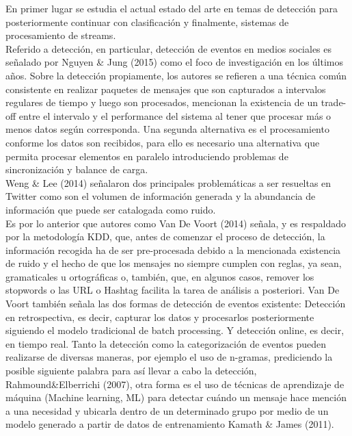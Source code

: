 En primer lugar se estudia el actual estado del arte en temas de detección para posteriormente continuar con clasificación y finalmente, sistemas de procesamiento de streams.\\

Referido a detección, en particular, detección de eventos en medios sociales es señalado por Nguyen \& Jung (2015) como el foco de investigación en los últimos años. Sobre la detección propiamente, los autores se refieren a una técnica común consistente en realizar paquetes de mensajes que son capturados a intervalos regulares de tiempo y luego son procesados, mencionan la existencia de un trade-off entre el intervalo y el performance del sistema al tener que procesar más o menos datos según corresponda. Una segunda alternativa es el procesamiento conforme los datos son recibidos, para ello es necesario una alternativa que permita procesar elementos en paralelo introduciendo problemas de sincronización y balance de carga.\\

Weng \& Lee (2014) señalaron dos principales problemáticas a ser resueltas en Twitter como son el volumen de información generada y la abundancia de información que puede ser catalogada como ruido.\\

Es por lo anterior que autores como Van De Voort (2014) señala, y es respaldado por la metodología KDD, que, antes de comenzar el proceso de detección, la información recogida ha de ser pre-procesada debido a la mencionada existencia de ruido y el hecho de que los mensajes no siempre cumplen con reglas, ya sean, gramaticales u ortográficas o, también, que, en algunos casos, remover los stopwords o las URL o Hashtag facilita la tarea de análisis a posteriori. Van De Voort también señala las dos formas de detección de eventos existente: Detección en retrospectiva, es decir, capturar los datos y procesarlos posteriormente siguiendo el modelo tradicional de batch processing. Y detección online, es decir, en tiempo real. Tanto la detección como la categorización de eventos pueden realizarse de diversas maneras, por ejemplo el uso de n-gramas, prediciendo la posible siguiente palabra para así llevar a cabo la detección, Rahmound\&Elberrichi (2007), otra forma es el uso de técnicas de aprendizaje de máquina (Machine learning, ML) para detectar cuándo un mensaje hace mención a una necesidad y ubicarla dentro de un determinado grupo por medio de un modelo generado a partir de datos de entrenamiento Kamath \& James (2011).\\

